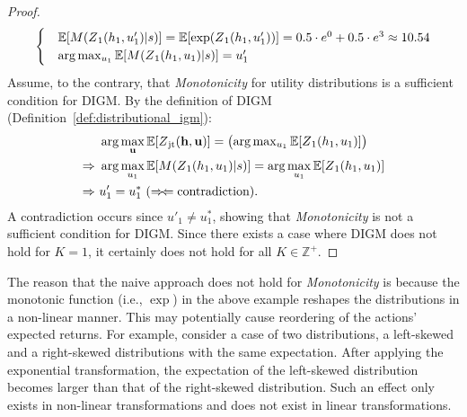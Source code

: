 \documentclass[twoside,11pt]{article}
\newcommand{\state}{s}
\newcommand{\jointaction}{\mathbf{u}}
\newcommand{\action}{u}
\newcommand{\jointobservationhistory}{\mathbf{h}}
\newcommand{\observationhistory}{h}
\newcommand{\numberofagents}{K}
\newcommand{\utility}{Z}
\newcommand{\joint}{\mathrm{jt}}
\newcommand{\monotonicfunction}{M}
\newcommand{\monotonicity}{\textit{Monotonicity}}
\newcounter{example0}
\newcounter{definition0}
\begin{document}
\begin{proof}
\begin{equation}
\begin{split}
\begin{cases}
&\mathbb{E}[\monotonicfunction{}(\utility{}_1(\observationhistory{}_1,\action{}'_1)\vert\state)]=\mathbb{E}[\exp(\utility{}_1(\observationhistory{}_1,\action{}'_1))]=0.5\cdot e^0+0.5\cdot e^3\approx 10.54 \\
&\arg\max_{\action_1}\mathbb{E}[\monotonicfunction{}(\utility{}_1(\observationhistory{}_1,\action{}_1)\vert\state)]=\action'_1\\
\end{cases}
\end{split}
\notag{}
\end{equation}
Assume, to the contrary, that \monotonicity{} for utility distributions is a sufficient condition for DIGM. By the definition of DIGM (Definition~\ref{def:distributional_igm}):
\begin{equation}
\begin{split}
&\arg\max_{\jointaction{}}\mathbb{E}[\utility{}_{\joint{}}(\jointobservationhistory{},{\jointaction{}})]=
\begin{pmatrix}
\arg\max_{\action{}_1}\mathbb{E}[\utility{}_1(\observationhistory{}_1,\action{}_1)]
\end{pmatrix}\\
\Rightarrow\ &\arg\max_{\action_1}\mathbb{E}[\monotonicfunction{}(\utility{}_1(\observationhistory{}_1,\action{}_1)\vert\state)]=\arg\max_{\action{}_1}\mathbb{E}[\utility{}_1(\observationhistory{}_1,\action{}_1)]\\
\Rightarrow\ &\action'_1=\action^*_1 \ (\Rightarrow\!\Leftarrow \text{contradiction}). \\
\end{split}
\notag{}
\end{equation}
A contradiction occurs since $\action'_1\ne\action^*_1$, showing that \monotonicity{} is not a sufficient condition for DIGM. Since there exists a case where DIGM does not hold for $\numberofagents=1$, it certainly does not hold for all $\numberofagents\in\mathbb{Z^{+}}$.
\end{proof} The reason that the naive approach does not hold for \monotonicity{} is because the monotonic function (i.e., $\exp$) in the above example
reshapes the distributions in a non-linear manner. This may potentially cause reordering of the actions’ expected returns. For example, consider a case of two distributions, a left-skewed and a right-skewed distributions with the same expectation. After applying the exponential transformation, the expectation of the left-skewed distribution becomes larger than that of the right-skewed distribution. Such an effect only exists in non-linear transformations and does not exist in linear transformations.
\end{document}
